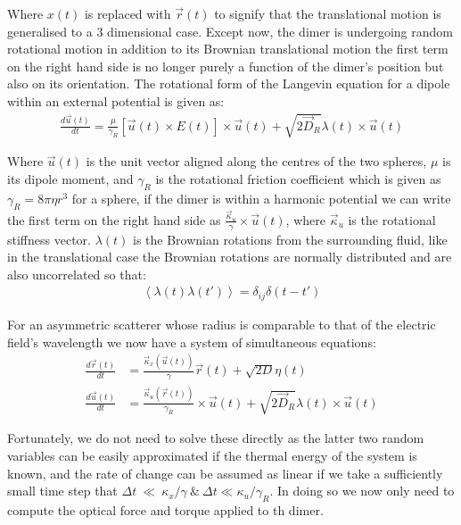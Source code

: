 Where $x(t)$ is replaced with $\vec{r}(t)$ to signify that the translational 
motion is generalised to a 3 dimensional case. Except now, the dimer 
is undergoing random rotational motion in addition to its Brownian 
translational motion the first term on the right hand side is no longer 
purely a function of the dimer's position but also on its orientation. 
The rotational form of the Langevin equation for a dipole within an external 
potential is given as:
\begin{align}
  \frac{{d}\vec{u}(t)}{{dt}}
  =
  \frac{\mu}{\gamma_R}\left[\vec{u}(t)\times E(t)\right]\times \vec{u}(t)
  + \sqrt{2\vec{D}_R}\lambda(t)\times \vec{u}(t)
\end{align}

Where $\vec{u}(t)$ is the unit vector aligned along the centres of the 
two spheres, $\mu$ is its dipole moment, and $\gamma_R$ is the rotational 
friction coefficient which is given as $\gamma_R = 8\pi\eta r^3$ for a 
sphere, if the dimer is within a harmonic potential we can write the first 
term on the right hand side as $\frac{\vec{\kappa}_u}{\gamma} \times 
\vec{u}(t)$, where $\vec{\kappa}_u$ is the rotational stiffness vector. 
$\lambda(t)$ is the Brownian rotations from the surrounding fluid, 
like in the translational case the Brownian rotations are normally 
distributed and are also uncorrelated so that:
\begin{align}
  \left<\lambda(t)\lambda(t')\right> = \delta_{ij}\delta(t-t')
\end{align}

For an asymmetric scatterer whose radius is comparable to that of the 
electric field's wavelength we now have a system of simultaneous equations:
\begin{align}
	\label{eq:full_langevin}
  \frac{{d}\vec{r}(t)}{{dt}}
  &=
    \frac{\vec{\kappa}_x(\vec{u}(t))}{\gamma}\vec{r}(t) + \sqrt{2D}\eta(t)
  \\
  \frac{{d}\vec{u}(t)}{{dt}}
  &=
    \frac{\vec{\kappa}_u(\vec{r}(t))}{\gamma_R}\times \vec{u}(t)
    + \sqrt{2\vec{D}_R}\lambda(t)\times \vec{u}(t)
\end{align}

Fortunately, we do not need to solve these directly as the latter two
random variables can be easily approximated if the thermal energy of
the system is known, and the rate of change can be assumed as linear if
we take a sufficiently small time step that $\Delta t~\ll~\kappa_x/\gamma 
\ \& \ \Delta t \ll \kappa_u/\gamma_R$. In doing so we now only need 
to compute the optical force and torque applied to th dimer. 

